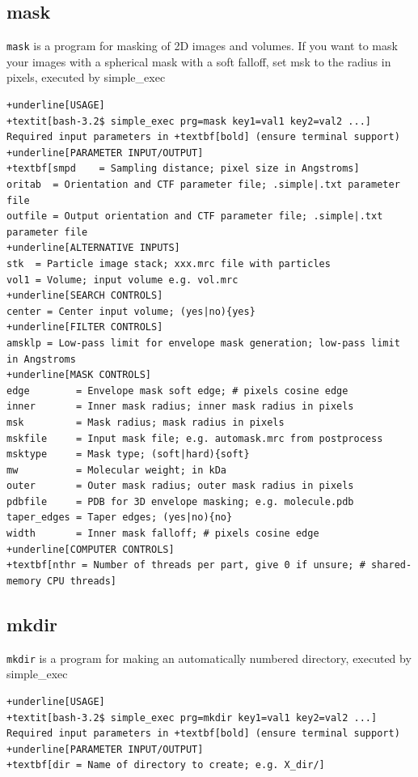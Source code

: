 \documentclass[a4paper,11pt]{article}
\newcommand{\prgname}[1]{\textcolor{NavyBlue}{\texttt{#1}}}
\begin{document}
\subsection{mask}
\label{mask}
\prgname{mask} is a program for masking of 2D images and volumes. If you want to mask your images with a spherical mask with a soft falloff, set msk to the radius in pixels, executed by simple\_exec
\begin{Verbatim}[commandchars=+\[\],fontsize=\small,breaklines=true]
+underline[USAGE]
+textit[bash-3.2$ simple_exec prg=mask key1=val1 key2=val2 ...]
Required input parameters in +textbf[bold] (ensure terminal support)
+underline[PARAMETER INPUT/OUTPUT]
+textbf[smpd    = Sampling distance; pixel size in Angstroms]
oritab  = Orientation and CTF parameter file; .simple|.txt parameter file
outfile = Output orientation and CTF parameter file; .simple|.txt parameter file
+underline[ALTERNATIVE INPUTS]
stk  = Particle image stack; xxx.mrc file with particles
vol1 = Volume; input volume e.g. vol.mrc
+underline[SEARCH CONTROLS]
center = Center input volume; (yes|no){yes}
+underline[FILTER CONTROLS]
amsklp = Low-pass limit for envelope mask generation; low-pass limit in Angstroms
+underline[MASK CONTROLS]
edge        = Envelope mask soft edge; # pixels cosine edge
inner       = Inner mask radius; inner mask radius in pixels
msk         = Mask radius; mask radius in pixels
mskfile     = Input mask file; e.g. automask.mrc from postprocess
msktype     = Mask type; (soft|hard){soft}
mw          = Molecular weight; in kDa
outer       = Outer mask radius; outer mask radius in pixels
pdbfile     = PDB for 3D envelope masking; e.g. molecule.pdb
taper_edges = Taper edges; (yes|no){no}
width       = Inner mask falloff; # pixels cosine edge
+underline[COMPUTER CONTROLS]
+textbf[nthr = Number of threads per part, give 0 if unsure; # shared-memory CPU threads]
\end{Verbatim}

\subsection{mkdir}
\label{mkdir}
\prgname{mkdir} is a program for making an automatically numbered directory, executed by simple\_exec
\begin{Verbatim}[commandchars=+\[\],fontsize=\small,breaklines=true]
+underline[USAGE]
+textit[bash-3.2$ simple_exec prg=mkdir key1=val1 key2=val2 ...]
Required input parameters in +textbf[bold] (ensure terminal support)
+underline[PARAMETER INPUT/OUTPUT]
+textbf[dir = Name of directory to create; e.g. X_dir/]
\end{Verbatim}
\end{document}
